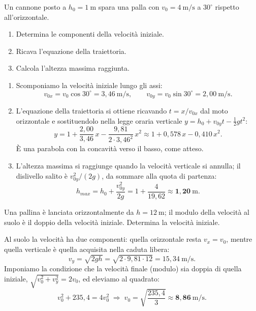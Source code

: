 
\begin{question}[ID=1.4, subtitle={Cannone a 1 m da terra con v₀ = 4 m/s a 30°}, tags={moto parabolico, traiettoria}, difficulty=media]
Un cannone posto a $h_0 = 1\ \mathrm{m}$ spara una palla con $v_0 = 4\ \mathrm{m/s}$ a $30^\circ$ rispetto all'orizzontale.
\begin{enumerate}
\item Determina le componenti della velocità iniziale.
\item Ricava l'equazione della traiettoria.
\item Calcola l'altezza massima raggiunta.
\end{enumerate}

\begin{solution}
\begin{enumerate}
\item Scomponiamo la velocità iniziale lungo gli assi:
\[
v_{0x} = v_0\cos 30^\circ = 3{,}46\ \mathrm{m/s}, \qquad v_{0y} = v_0\sin 30^\circ = 2{,}00\ \mathrm{m/s}.
\]
\item L'equazione della traiettoria si ottiene ricavando $t = x/v_{0x}$ dal moto orizzontale e sostituendolo nella legge oraria verticale $y = h_0 + v_{0y}t - \tfrac{1}{2}gt^2$:
\[
y = 1 + \frac{2{,}00}{3{,}46}\,x - \frac{9{,}81}{2\cdot 3{,}46^2}\,x^2 \approx 1 + 0{,}578\,x - 0{,}410\,x^2.
\]
È una parabola con la concavità verso il basso, come atteso.
\item L'altezza massima si raggiunge quando la velocità verticale si annulla; il dislivello salito è $v_{0y}^2/(2g)$, da sommare alla quota di partenza:
\[
h_{max} = h_0 + \frac{v_{0y}^2}{2g} = 1 + \frac{4}{19{,}62} \approx \mathbf{1{,}20\ \mathrm{m}}.
\]
\end{enumerate}
\end{solution}
\end{question}


\begin{question}[ID=1.5, subtitle={Lancio orizzontale: velocità finale doppia della iniziale}, tags={moto parabolico, lancio orizzontale}, difficulty=media]
Una pallina è lanciata orizzontalmente da $h = 12\ \mathrm{m}$; il modulo della velocità al suolo è il doppio della velocità iniziale. Determina la velocità iniziale.

\begin{solution}
Al suolo la velocità ha due componenti: quella orizzontale resta $v_x = v_0$, mentre quella verticale è quella acquisita nella caduta libera:
\[
v_y = \sqrt{2gh} = \sqrt{2\cdot 9{,}81\cdot 12} = 15{,}34\ \mathrm{m/s}.
\]
Imponiamo la condizione che la velocità finale (modulo) sia doppia di quella iniziale, $\sqrt{v_0^2 + v_y^2} = 2v_0$, ed eleviamo al quadrato:
\[
v_0^2 + 235{,}4 = 4v_0^2 \;\Rightarrow\; v_0 = \sqrt{\frac{235{,}4}{3}} \approx \mathbf{8{,}86\ \mathrm{m/s}}.
\]
\end{solution}
\end{question}

